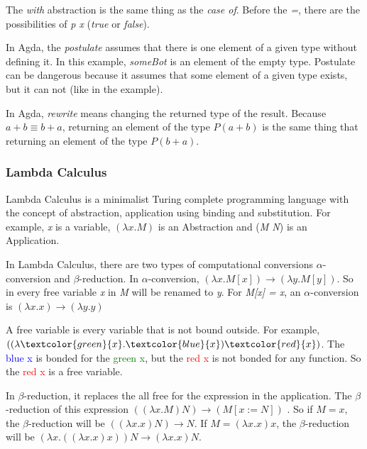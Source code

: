   The \emph{with} abstraction is the same thing as the \emph{case of}.
  Before the \emph{=}, there are the possibilities of \emph{p x} (\emph{true} or \emph{false}).


  In Agda, the \emph{postulate} assumes that there is one element of a given type without defining it.
  In this example, \emph{someBot} is an element of the empty type.
  Postulate can be dangerous because it assumes that some element of a given type exists,
  but it can not (like in the example).


  In Agda, \emph{rewrite} means changing the returned type of the result.
  Because $a + b ≡ b + a$, returning an element of the type $P (a + b)$ is the
  same thing that returning an element of the type $P (b + a)$.

  \subsubsection{Lambda Calculus}
  Lambda Calculus is a minimalist Turing complete programming language with the concept of abstraction,
  application using binding and substitution. For example, \emph{x} is a variable, $(\lambda x.M)$
  is an Abstraction and (\emph{M N}) is an Application.

  In Lambda Calculus, there are two types of computational conversions $\alpha$-conversion
  and $\beta$-reduction.
  In $\alpha$-conversion, $(\lambda x.M[x]) \rightarrow (\lambda y.M[y])$.
  So in every free variable \emph{x} in \emph{M} will be renamed to \emph{y}.
  For \emph{M[x] = x}, an $\alpha$-conversion is $(\lambda x.x) \rightarrow (\lambda y.y)$

  A free variable is every variable that is not bound outside.
  For example, $((\lambda\textcolor{green}{x}.\textcolor{blue}{x}) \textcolor{red}{x})$.
  The \textcolor{blue}{blue x} is bonded for the \textcolor{green}{green x},
  but the \textcolor{red}{red x}
  is not bonded for any function. So the \textcolor{red}{red x} is a free variable.

  In $\beta$-reduction, it replaces the all free for the expression in the application.
  The $\beta$-reduction of this expression $((\lambda x.M) N) \rightarrow (M[x := N])$ .
  So if $M = x$, the $\beta$-reduction will be $((\lambda x.x) N) \rightarrow N$.
  If $M = (\lambda x.x) x$, the $\beta$-reduction will be
  $(\lambda x.((\lambda x.x)x))N \rightarrow (\lambda x.x)N$.


